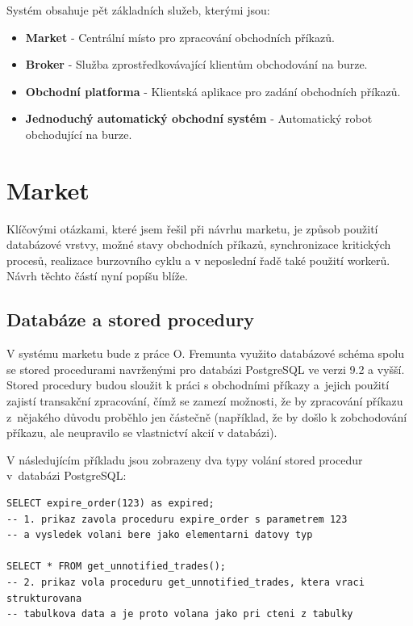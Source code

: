 \documentclass[thesis=M,czech]{FITthesis}[2012/06/26]
\begin{document}
	Systém obsahuje pět základních služeb, kterými jsou:
	
\begin{itemize}

\item \textbf{Market} - Centrální místo pro zpracování obchodních příkazů.

\item \textbf{Broker} - Služba zprostředkovávající klientům obchodování na burze.

\item \textbf{Obchodní platforma} - Klientská aplikace pro zadání obchodních příkazů.

\item \textbf{Jednoduchý automatický obchodní systém} - Automatický robot obchodující na burze.

\end{itemize}

\section{Market}
	
	Klíčovými otázkami, které jsem řešil při návrhu marketu, je způsob použití databázové vrstvy, možné stavy obchodních příkazů, synchronizace kritických procesů, realizace burzovního cyklu a v neposlední řadě také použití workerů. Návrh těchto částí nyní popíšu blíže.
	
\subsection{Databáze a stored procedury}

	V systému marketu bude z práce O. Fremunta \cite{Fremunt2014} využito databázové schéma spolu se stored procedurami navrženými pro databázi PostgreSQL ve verzi 9.2 a vyšší. Stored procedury budou sloužit k práci s obchodními příkazy a~jejich použití zajistí transakční zpracování, čímž se zamezí možnosti, že by zpracování příkazu z~nějakého důvodu proběhlo jen částečně (například, že by došlo k zobchodování příkazu, ale neupravilo se vlastnictví akcií v databázi).

	V následujícím příkladu jsou zobrazeny dva typy volání stored procedur v~databázi PostgreSQL:

\begin{lstlisting}[basicstyle={\tiny\ttfamily}, frame=single] 
SELECT expire_order(123) as expired;
-- 1. prikaz zavola proceduru expire_order s parametrem 123
-- a vysledek volani bere jako elementarni datovy typ

SELECT * FROM get_unnotified_trades();
-- 2. prikaz vola proceduru get_unnotified_trades, ktera vraci strukturovana
-- tabulkova data a je proto volana jako pri cteni z tabulky
\end{lstlisting}
	
\end{document}
